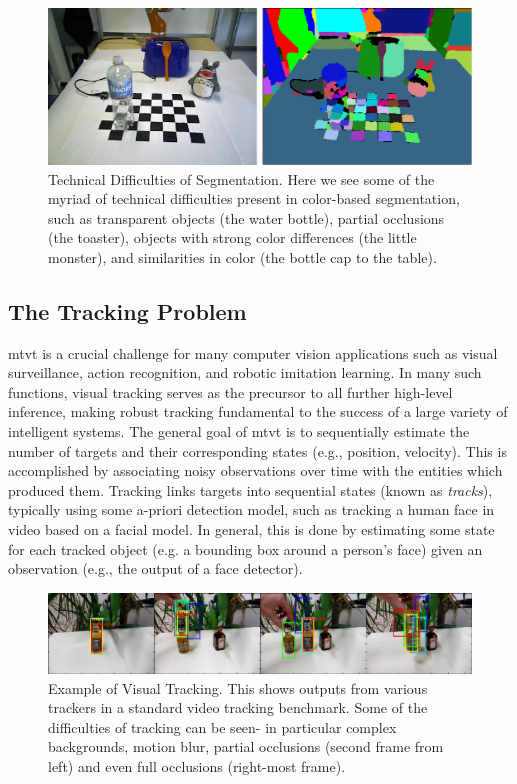 \begin{figure}
\label{fig:SegmentationProblems}
\centering
\includegraphics[width=\linewidth]{figures/Introduction/Segmentation_Problems.pdf}
\caption[Technical Difficulties of Segmentation]{Technical Difficulties of Segmentation. Here we see some of the myriad of technical difficulties present in color-based segmentation, such as transparent objects (the water bottle), partial occlusions (the toaster), objects with strong color differences (the little monster), and similarities in color (the bottle cap to the table).}
\end{figure}


\subsection{The Tracking Problem}
\gls{mtvt} is a crucial challenge for many computer vision applications such as visual surveillance, action recognition, and robotic imitation learning. In many such functions, visual tracking serves as the precursor to all further high-level inference, making robust tracking fundamental to the success of a large variety of intelligent systems. The general goal of \gls{mtvt} is to sequentially estimate the number of targets and their corresponding states (e.g., position, velocity). This is accomplished by associating noisy observations over time with the entities which produced them. Tracking links targets into sequential states (known as \emph{tracks}), typically using some a-priori detection model, such as tracking a human face in video based on a facial model. In general, this is done by estimating some state for each tracked object (e.g. a bounding box around a person's face) given an observation (e.g., the output of a face detector).

\begin{figure}
\label{fig:ExampleTracking}
\centering
\includegraphics[width=\linewidth]{figures/Introduction/Tracking_Example.pdf}
\caption[Example of Visual Tracking]{Example of Visual Tracking. This shows outputs from various trackers in a standard video tracking benchmark. Some of the difficulties of tracking can be seen- in particular complex backgrounds, motion blur, partial occlusions (second frame from left) and even full occlusions (right-most frame).}
\end{figure}


